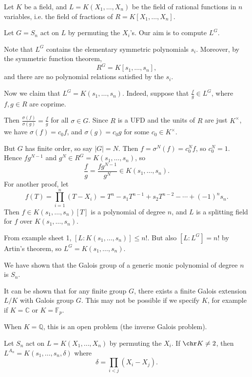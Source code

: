 \documentclass[12pt]{article}
\begin{document}
\begin{exbox}
	Let $K$ be a field, and $L = K(X_1, \ldots, X_n)$ be the field of rational functions in $n$ variables, i.e. the field of fractions of $R = K[X_1, \ldots, X_n]$.

	Let $G = S_n$ act on $L$ by permuting the $X_i$'s. Our aim is to compute $L^G$.

	Note that $L^G$ contains the elementary symmetric polynomials $s_i$. Moreover, by the symmetric function theorem,
	\[
		R^G = K[s_1, \ldots, s_n],
	\]
	and there are no polynomial relations satisfied by the $s_i$.

	Now we claim that $L^G = K(s_1, \ldots, s_n)$. Indeed, suppose that $\frac{f}{g} \in L^G$, where $f, g \in R$ are coprime.

	Then $\frac{\sigma(f)}{\sigma(g)} = \frac{f}{g}$ for all $\sigma \in G$. Since $R$ is a UFD and the units of $R$ are just $K^{\times}$, we have $\sigma(f) = c_0 f$, and $\sigma(g) = c_0 g$ for some $c_0 \in K^{\times}$.

	But $G$ has finite order, so say $|G| = N$. Then $f = \sigma^{N}(f) = c_0^N f$, so $c_0^N = 1$. Hence $fg^{N-1}$ and $g^N \in R^G = K(s_1, \ldots, s_n)$, so
	\[
	\frac{f}{g} = \frac{fg^{N-1}}{g^{N}} \in K(s_1, \ldots, s_n).
	\]
	For another proof, let
	\[
	f(T) = \prod_{i = 1}^{n} (T - X_i) = T^{n} - s_1 T^{n-1} + s_2 T^{n-2} - \cdots + (-1)^{n} s_n.
	\]
	Then $f \in K(s_1, \ldots, s_n)[T]$ is a polynomial of degree $n$, and $L$ is a splitting field for $f$ over $K(s_1, \ldots, s_n)$.

	From example sheet 1, $[L:K(s_1, \ldots, s_n)] \leq n!$. But also $[L:L^G] = n!$ by Artin's theorem, so $L^G = K(s_1, \ldots, s_n)$.
\end{exbox}

\begin{remark}
	We have shown that the Galois group of a generic monic polynomial of degree $n$ is $S_n$.
\end{remark}

It can be shown that for any finite group $G$, there exists a finite Galois extension $L/K$ with Galois group $G$. This may not be possible if we specify $K$, for example if $K = \mathbb{C}$ or $K = \mathbb{F}_p$.

When $K = \mathbb{Q}$, this is an open problem (the inverse Galois problem).

\begin{corollary}
	Let $S_n$ act on $L = K(X_1, \ldots, X_n)$ by permuting the $X_i$. If $\chr K \neq 2$, then $L^{A_n} = K(s_1, \ldots, s_n, \delta)$ where
	\[
	\delta = \prod_{i < j} (X_i - X_j).
	\]
\end{corollary}
\end{document}
